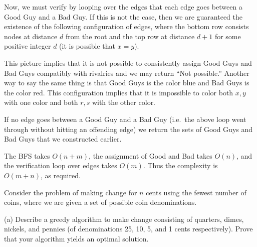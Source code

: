 \documentclass[10pt,reqno]{amsart}
\begin{document}
\begin{outline}[enumerate]
Now, we must verify by looping over the edges that each edge goes between a
Good Guy and a Bad Guy. If this is not the case, then we are guaranteed the
existence of the following configuration of edges, where the bottom row
consists nodes at distance $d$ from the root and the top row at distance $d+1$
for some positive integer $d$ (it is possible that $x=y$).

\begin{center}
\end{center}

This picture implies that it is not possible to consistently assign Good Guys
and Bad Guys compatibly with rivalries and we may return ``Not possible.''
Another way to say the same thing is that Good Guys is the color blue and Bad
Guys is the color red. This configuration implies that it is impossible to
color both $x,y$ with one color and both $r,s$ with the other color.

If no edge goes between a Good Guy and a Bad Guy (i.e.~the above loop went
through without hitting an offending edge) we return the sets of Good Guys and
Bad Guys that we constructed earlier.

The BFS takes $O(n+m)$, the assignment of Good and Bad takes $O(n)$, and the
verification loop over edges takes $O(m)$. Thus the complexity is $O(m+n)$, as
required.

\medskip

\1 Consider the problem of making change for $n$ cents using the fewest number
of coins, where we are given a set of possible coin denominations.

(a) Describe a greedy algorithm to make change consisting of quarters, dimes,
nickels, and pennies (of denominations 25, 10, 5, and 1 cents respectively).
Prove that your algorithm yields an optimal solution.



\end{outline}
\end{document}
